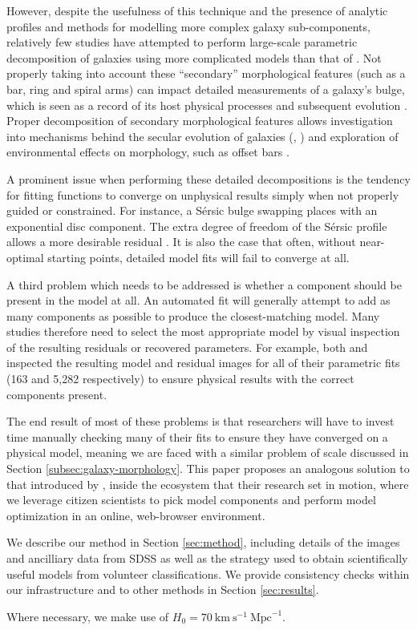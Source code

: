 \documentclass[../main.tex]{subfiles}
\begin{document}
However, despite the usefulness of this technique and the presence of analytic profiles and methods for modelling more complex galaxy sub-components, relatively few studies have attempted to perform large-scale parametric decomposition of galaxies using more complicated models than that of \citet{Simard2002:astro-ph/0205025v2}. Not properly taking into account these ``secondary'' morphological features (such as a bar, ring and spiral arms) can impact detailed measurements of a galaxy's bulge, which is seen as a record of its host physical processes and subsequent evolution \citep{Gao2017:1709.00746v1}. Proper decomposition of secondary morphological features allows investigation into mechanisms behind the secular evolution of galaxies (\citealt{2018MNRAS.473.4731K}, \citealt{2018ApJ...862..100G}) and exploration of environmental effects on morphology, such as offset bars \citep{2017MNRAS.469.3363K}.

A prominent issue when performing these detailed decompositions is the tendency for fitting functions to converge on unphysical results simply when not properly guided or constrained. For instance, a S\'ersic bulge swapping places with an exponential disc component. The extra degree of freedom of the S\'ersic profile allows a more desirable residual \citep{2017MNRAS.469.3363K}. It is also the case that often, without near-optimal starting points, detailed model fits will fail to converge at all.

A third problem which needs to be addressed is whether a component should be present in the model at all. An automated fit will generally attempt to add as many components as possible to produce the closest-matching model. Many studies therefore need to select the most appropriate model by visual inspection of the resulting residuals or recovered parameters. For example, both \citet{Vika2014:1408.4070v1} and \citet{2018MNRAS.473.4731K} inspected the resulting model and residual images for all of their parametric fits (163 and 5,282 respectively) to ensure physical results with the correct components present.

The end result of most of these problems is that researchers will have to invest time manually checking many of their fits to ensure they have converged on a physical model, meaning we are faced with a similar problem of scale discussed in Section \ref{subsec:galaxy-morphology}. This paper proposes an analogous solution to that introduced by \cite{Lintott2008:0804.4483v1}, inside the ecosystem that their research set in motion, where we leverage citizen scientists to pick model components and perform model optimization in an online, web-browser environment.

We describe our method in Section \ref{sec:method}, including details of the images and ancilliary data from SDSS as well as the strategy used to obtain scientifically useful models from volunteer classifications. We provide consistency checks within our infrastructure and to other methods in Section \ref{sec:results}.

Where necessary, we make use of $H_0 = 70\ \text{km}\ \text{s}^{-1}\ \text{Mpc}^{-1}$.
\end{document}
